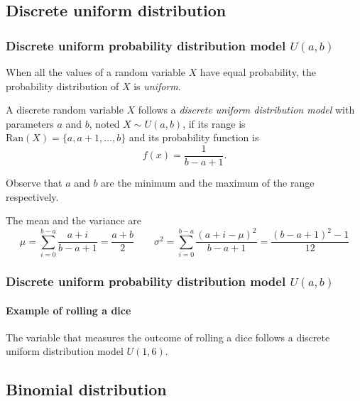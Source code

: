 \subsection{Discrete uniform distribution}

\begin{frame}
\frametitle{Discrete uniform probability distribution model $U(a,b)$}
When all the values of a random variable $X$ have equal probability, the probability distribution of $X$ is \emph{uniform}.

\begin{definition}
A discrete random variable $X$ follows a \emph{discrete uniform distribution model} with parameters $a$ and $b$, noted $X\sim U(a,b)$, if its range is $\mbox{Ran}(X) = \{a, a+1, \ldots,b\}$ and its probability function is
\[
  f(x)=\frac{1}{b-a+1}.
\]
\end{definition}

Observe that $a$ and $b$ are the minimum and the maximum of the range respectively. 

The mean and the variance are
\[
\mu = \sum_{i=0}^{b-a}\frac{a+i}{b-a+1}=\frac{a+b}{2} \qquad \sigma^2 =\sum_{i=0}^{b-a}\frac{(a+i-\mu)^2}{b-a+1}=
\frac{(b-a+1)^2-1}{12}
\]
\end{frame}


\begin{frame}
\frametitle{Discrete uniform probability distribution model $U(a,b)$}
\framesubtitle{Example of rolling a dice}
The variable that measures the outcome of rolling a dice follows a discrete uniform distribution model $U(1,6)$.
\begin{center}
\end{center}
\end{frame}


\subsection{Binomial distribution}

